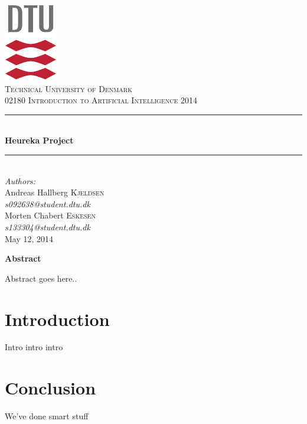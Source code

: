 \documentclass[11pt]{report}
\newcommand{\HRule}{\rule{\linewidth}{0.5mm}}
\begin{document}
\begin{titlepage}
\begin{center}

\includegraphics[scale=2.0]{GFX/dtu_logo.pdf}\\[1cm]

\textsc{\LARGE Technical University of Denmark}\\[1cm]

\textsc{\Large 02180 Introduction to Artificial Intelligence 2014}\\[0.5cm]


\HRule \\[0.4cm]
{\huge \bfseries Heureka Project}\\[0.1cm]
\HRule \\[1cm]

\large
\emph{Authors:}
\\[10pt]
Andreas Hallberg \textsc{Kjeldsen}\\
\emph{s092638@student.dtu.dk}
\\[10pt]
Morten Chabert \textsc{Eskesen}\\
\emph{s133304@student.dtu.dk}\\[1cm]

{\large May 12, 2014}\\[1.5cm]
\end{center}

\begin{center}
	\textbf{Abstract}
\end{center}
Abstract goes here..



\end{titlepage}

\section*{Introduction}
Intro intro intro

\section*{Conclusion}
We've done smart stuff
\end{document}
